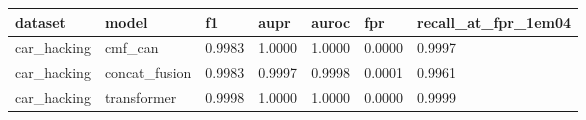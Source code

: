 \begin{tabular}{lllllll}
\toprule
dataset & model & f1 & aupr & auroc & fpr & recall\_at\_fpr\_1em04 \\
\midrule
car\_hacking & cmf\_can & 0.9983 & 1.0000 & 1.0000 & 0.0000 & 0.9997 \\
car\_hacking & concat\_fusion & 0.9983 & 0.9997 & 0.9998 & 0.0001 & 0.9961 \\
car\_hacking & transformer & 0.9998 & 1.0000 & 1.0000 & 0.0000 & 0.9999 \\
\bottomrule
\end{tabular}
